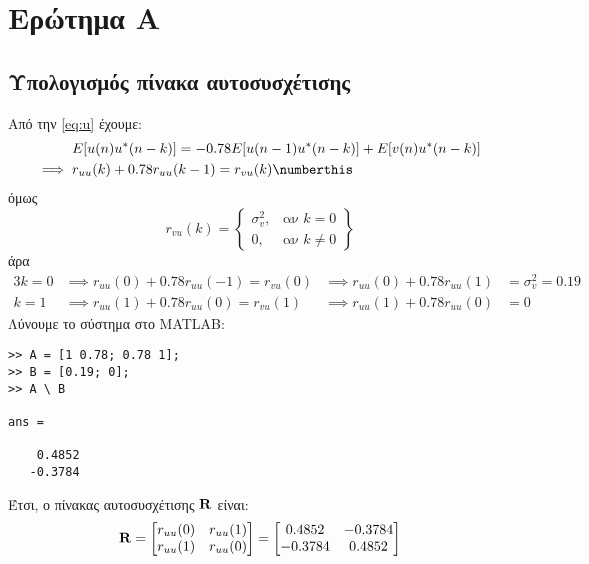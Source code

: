 \section{Ερώτημα Α}
\subsection{Υπολογισμός πίνακα αυτοσυσχέτισης}
Από την \eqref{eq:u} έχουμε:
\begin{align*}
&E[u(n) u^*(n-k)] = -0.78E[u(n-1) u^*(n-k)] + E[v(n) u^*(n-k)]\\
\implies{}&r_{uu}(k) + 0.78r_{uu}(k-1) = r_{vu}(k)
\numberthis
\end{align*}
όμως
\begin{equation}
r_{vu}(k) = \left\{
    \begin{array}{lr}
        \sigma_v^2,& \text{αν }k = 0\\
        0,& \text{αν }k \neq 0
    \end{array}
\right\}
\end{equation}
άρα
\begin{alignat}{3}
k = 0 &\implies r_{uu}(0) + 0.78r_{uu}(-1) = r_{vu}(0) &\implies r_{uu}(0) + 0.78r_{uu}(1) &= \sigma_v^2 = 0.19\\
k = 1 &\implies r_{uu}(1) + 0.78r_{uu}(0) = r_{vu}(1) &\implies r_{uu}(1) + 0.78r_{uu}(0) &= 0
\end{alignat}
Λύνουμε το σύστημα στο MATLAB:
\begin{lstlisting}[caption={Επίλυση συστήματος στο MATLAB}]
>> A = [1 0.78; 0.78 1];
>> B = [0.19; 0];
>> A \ B

ans =

    0.4852
   -0.3784
\end{lstlisting}
Έτσι, ο πίνακας αυτοσυσχέτισης $\mathbf{R}$ είναι:
\begin{equation}
\mathbf{R} = \begin{bmatrix}
    r_{uu}(0) & r_{uu}(1)\\
    r_{uu}(1) & r_{uu}(0)
\end{bmatrix} =
\begin{bmatrix}
    0.4852 & -0.3784\\
    -0.3784 & 0.4852
\end{bmatrix}
\end{equation}


